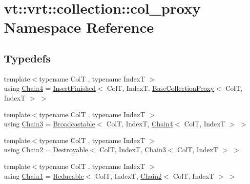 \hypertarget{namespacevt_1_1vrt_1_1collection_1_1col__proxy}{}\section{vt\+:\+:vrt\+:\+:collection\+:\+:col\+\_\+proxy Namespace Reference}
\label{namespacevt_1_1vrt_1_1collection_1_1col__proxy}
\subsection*{Typedefs}
\begin{DoxyCompactItemize}
\item 
{\footnotesize template$<$typename ColT , typename IndexT $>$ }\\using \hyperlink{namespacevt_1_1vrt_1_1collection_1_1col__proxy_a5d45d2ec968c43d468668d6badb2b61e}{Chain4} = \hyperlink{structvt_1_1vrt_1_1collection_1_1_insert_finished}{Insert\+Finished}$<$ ColT, IndexT, \hyperlink{structvt_1_1vrt_1_1collection_1_1_base_collection_proxy}{Base\+Collection\+Proxy}$<$ ColT, IndexT $>$ $>$
\item 
{\footnotesize template$<$typename ColT , typename IndexT $>$ }\\using \hyperlink{namespacevt_1_1vrt_1_1collection_1_1col__proxy_aa83ea97afbf21f975d02b933af0ee42c}{Chain3} = \hyperlink{structvt_1_1vrt_1_1collection_1_1_broadcastable}{Broadcastable}$<$ ColT, IndexT, \hyperlink{namespacevt_1_1vrt_1_1collection_1_1col__proxy_a5d45d2ec968c43d468668d6badb2b61e}{Chain4}$<$ ColT, IndexT $>$ $>$
\item 
{\footnotesize template$<$typename ColT , typename IndexT $>$ }\\using \hyperlink{namespacevt_1_1vrt_1_1collection_1_1col__proxy_a0c21e18852e5deea513629fe02399bb5}{Chain2} = \hyperlink{structvt_1_1vrt_1_1collection_1_1_destroyable}{Destroyable}$<$ ColT, IndexT, \hyperlink{namespacevt_1_1vrt_1_1collection_1_1col__proxy_aa83ea97afbf21f975d02b933af0ee42c}{Chain3}$<$ ColT, IndexT $>$ $>$
\item 
{\footnotesize template$<$typename ColT , typename IndexT $>$ }\\using \hyperlink{namespacevt_1_1vrt_1_1collection_1_1col__proxy_a829dc1f247cb9518d83ccfb6ca9158a9}{Chain1} = \hyperlink{structvt_1_1vrt_1_1collection_1_1_reducable}{Reducable}$<$ ColT, IndexT, \hyperlink{namespacevt_1_1vrt_1_1collection_1_1col__proxy_a0c21e18852e5deea513629fe02399bb5}{Chain2}$<$ ColT, IndexT $>$ $>$
\end{DoxyCompactItemize}


